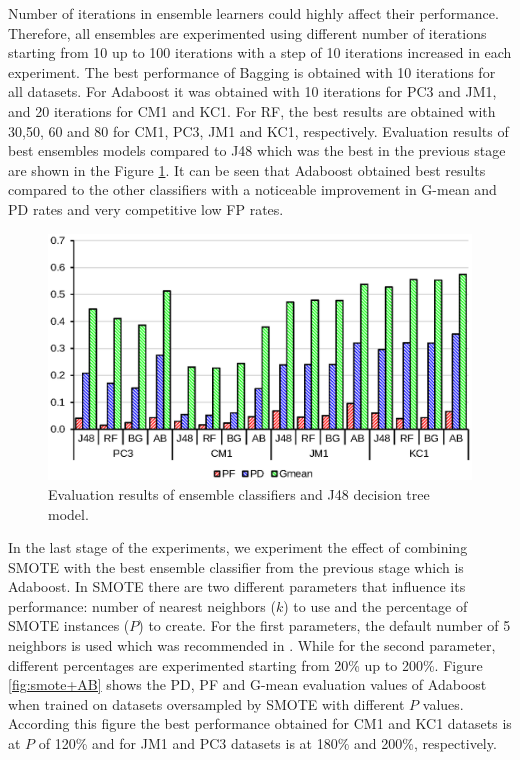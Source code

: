 \documentclass[runningheads,a4paper]{llncs}
\begin{document}
Number of iterations in ensemble learners could highly affect their performance. Therefore, all ensembles are experimented using different number of iterations starting from 10 up to 100 iterations with a step of 10 iterations increased in each experiment. The best performance of Bagging is obtained with 10 iterations for all datasets. For Adaboost it was obtained with 10 iterations for PC3 and JM1, and 20 iterations for CM1 and KC1. For RF, the best results are obtained with 30,50, 60 and 80 for CM1, PC3, JM1 and KC1, respectively. Evaluation results of best ensembles models compared to J48 which was the best in the previous stage are shown in the Figure \ref{fig:ensembles}. It can be seen that Adaboost obtained best results compared to the other classifiers with a noticeable improvement in G-mean and PD rates and very competitive low FP rates.

\begin{figure}[h]
\centering
\includegraphics[scale=0.6]{Ensembles.eps}
\caption{Evaluation results of ensemble classifiers and J48 decision tree model.}
\label{fig:ensembles}
\end{figure}


In the last stage of the experiments, we experiment the effect of combining SMOTE with the best ensemble classifier from the previous stage which is Adaboost. In SMOTE there are two different parameters that influence its performance: number of nearest neighbors ($k$) to use and the percentage of SMOTE instances ($P$) to create. For the first parameters, the default number of 5 neighbors is used which was recommended in \cite{chawla2002smote}. While for the second parameter, different percentages are experimented starting from 20\% up to 200\%. Figure \ref{fig:smote+AB} shows the PD, PF and G-mean evaluation values of Adaboost when trained on datasets oversampled by SMOTE with different $P$ values. According this figure the best performance obtained for CM1 and KC1 datasets is at $P$ of 120\% and for JM1 and PC3 datasets is at 180\% and 200\%, respectively.
\end{document}
